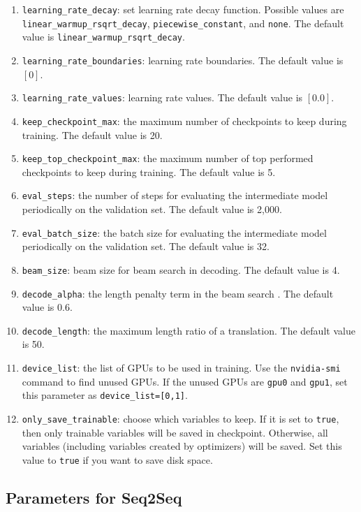 \documentclass{article}
\begin{document}
\begin{enumerate}
\item \verb|learning_rate_decay|: set learning rate decay function. Possible values are \verb|linear_warmup_rsqrt_decay|, \verb|piecewise_constant|, and \verb|none|. The default value is \verb|linear_warmup_rsqrt_decay|.
\item \verb|learning_rate_boundaries|: learning rate boundaries. The default value is $[0]$.
\item \verb|learning_rate_values|: learning rate values. The default value is $[0.0]$.
\item \verb|keep_checkpoint_max|: the maximum number of checkpoints to keep during training. The default value is 20.
\item \verb|keep_top_checkpoint_max|: the maximum number of top performed checkpoints to keep during training. The default value is 5.
\item \verb|eval_steps|: the number of steps for evaluating the intermediate model periodically on the validation set. The default value is 2,000.
\item \verb|eval_batch_size|: the batch size for evaluating the intermediate model periodically on the validation set. The default value is 32.
\item \verb|beam_size|: beam size for beam search in decoding. The default value is 4.
\item \verb|decode_alpha|: the length penalty term in the beam search \citep{Wu:16}. The default value is 0.6.
\item \verb|decode_length|: the maximum length ratio of a translation. The default value is 50.
\item \verb|device_list|: the list of GPUs to be used in training. Use the \verb|nvidia-smi| command to find unused GPUs. If the unused GPUs are \verb|gpu0| and \verb|gpu1|, set this parameter as \verb|device_list=[0,1]|.
\item \verb|only_save_trainable|: choose which variables to keep. If it is set to \verb|true|, then only trainable variables will be saved in checkpoint. Otherwise, all variables (including variables created by optimizers) will be saved. Set this value to \verb|true| if you want to save disk space.
\end{enumerate}

\subsection{Parameters for Seq2Seq}
\end{document}
